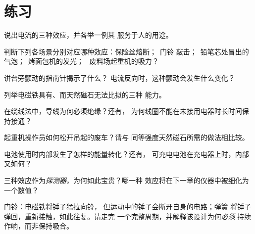 \section{练习}

\begin{exercise}[$\star$]\label{exo:g8:electric-current-effects:1}
说出电流的三种效应，并各举一例其
服务于人的用途。
\end{exercise}

\begin{exercise}[$\star$]\label{exo:g8:electric-current-effects:2}
判断下列各场景分别对应哪种效应：保险丝熔断；\ 门铃
敲击；\ 铅笔芯处冒出的气泡；\ 烤面包机的发光；
\ 废料场起重机的吸力？
\end{exercise}

\begin{exercise}[$\star$]\label{exo:g8:electric-current-effects:3}
讲台旁颤动的指南针揭示了什么？
电流反向时，这种颤动会发生什么变化？
\end{exercise}

\begin{exercise}[$\star$]\label{exo:g8:electric-current-effects:4}
列举电磁铁具有、而天然磁石无法比拟的三种
能力。
\end{exercise}

\begin{exercise}[$\star$]\label{exo:g8:electric-current-effects:5}
在绕线法中，导线为何必须绝缘？还有，
为何线圈不能在未接用电器时长时间保持接通？
\end{exercise}

\begin{exercise}[$\star$]\label{exo:g8:electric-current-effects:6}
起重机操作员如何松开吊起的废车？请与
同等强度天然磁石所需的做法相比较。
\end{exercise}

\begin{exercise}[$\star$]\label{exo:g8:electric-current-effects:7}
电池使用时内部发生了怎样的能量转化？还有，
可充电电池在充电器上时，内部又如何？
\end{exercise}

\begin{exercise}[$\star$]\label{exo:g8:electric-current-effects:8}
三种效应作为\emph{探测器}，为何如此宝贵？哪一种
效应将在下一章的仪器中被细化为
一个数值？
\end{exercise}

\begin{exercise}[$\star\star$]\label{exo:g8:electric-current-effects:9}
门铃：电磁铁将锤子猛拉向铃，
但运动中的锤子会断开自身的电路；弹簧
将锤子弹回，重新接触，如此往复。请走完
一个完整周期，并解释该设计为何\emph{必须}
持续作响，而非保持吸合。
\end{exercise}

